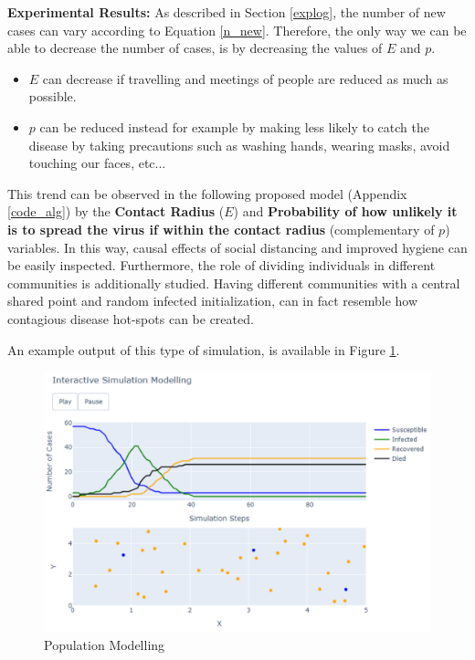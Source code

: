 \textbf{Experimental Results:} As described in Section \ref{explog}, the number of new cases can vary according to Equation \ref{n_new}. Therefore, the only way we can be able to decrease the number of cases, is by decreasing the values of $E$ and $p$. 
\begin{itemize}
    \setlength\itemsep{-0.3cm}
    \item $E$ can decrease if travelling and meetings of people are reduced as much as possible.
    \item $p$ can be reduced instead for example by making less likely to catch the disease by taking precautions such as washing hands, wearing masks, avoid touching our faces, etc...
\end{itemize}

This trend can be observed in the following proposed model (Appendix \ref{code_alg}) by the \textbf{Contact Radius} ($E$) and \textbf{Probability of how unlikely it is to spread the virus if within the contact radius} (complementary of $p$) variables.
In this way, causal effects of social distancing and improved hygiene can be easily inspected. Furthermore, the role of dividing individuals in different communities is additionally studied. Having different communities with a central shared point and random infected initialization, can in fact resemble how contagious disease hot-spots can be created.

An example output of this type of simulation, is available in Figure \ref{pop}.

\begin{figure}[ht!]%
    \centering
    \includegraphics[width=0.85\linewidth]{latex/images/pop.pdf}
    \caption{Population Modelling}
    \label{pop}
\end{figure}

